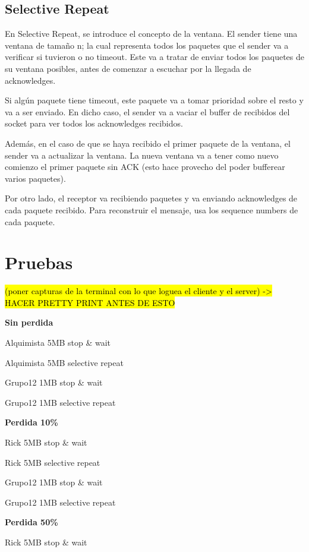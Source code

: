 \documentclass{article}
\begin{document}
\subsection{Selective Repeat}\label{selective-repeat}

En Selective Repeat, se introduce el concepto de la ventana. El sender
tiene una ventana de tamaño n; la cual representa todos los paquetes que
el sender va a verificar si tuvieron o no timeout. Este va a tratar de
enviar todos los paquetes de su ventana posibles, antes de comenzar a
escuchar por la llegada de acknowledges.

Si algún paquete tiene timeout, este paquete va a tomar prioridad sobre
el resto y va a ser enviado. En dicho caso, el sender va a vaciar el
buffer de recibidos del socket para ver todos los acknowledges
recibidos.

Además, en el caso de que se haya recibido el primer paquete de la
ventana, el sender va a actualizar la ventana. La nueva ventana va a
tener como nuevo comienzo el primer paquete sin ACK (esto hace provecho
del poder bufferear varios paquetes).

Por otro lado, el receptor va recibiendo paquetes y va enviando
acknowledges de cada paquete recibido. Para reconstruir el mensaje, usa
los sequence numbers de cada paquete.

\section{\texorpdfstring{\textbf{Pruebas}}{Pruebas}}\label{pruebas-wip}

\hl{(poner capturas de la terminal con lo que loguea el cliente y el
server) -\textgreater{} HACER PRETTY PRINT ANTES DE ESTO}

\textbf{Sin perdida}

Alquimista 5MB stop \& wait

Alquimista 5MB selective repeat

Grupo12 1MB stop \& wait

Grupo12 1MB selective repeat

\textbf{Perdida 10\%}

Rick 5MB stop \& wait

Rick 5MB selective repeat

Grupo12 1MB stop \& wait

Grupo12 1MB selective repeat

\textbf{Perdida 50\%}

Rick 5MB stop \& wait
\end{document}
